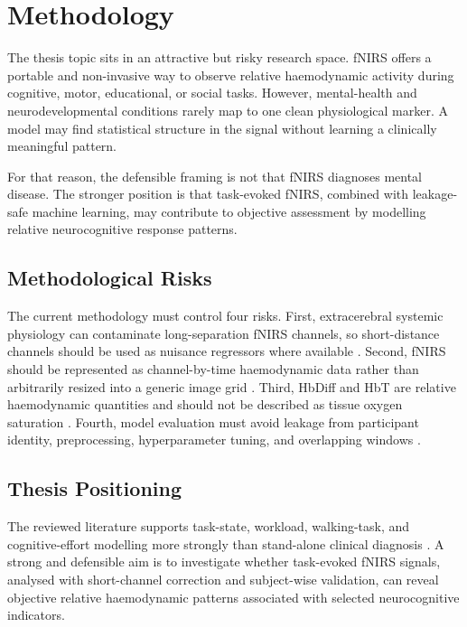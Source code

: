 \section{Methodology}

The thesis topic sits in an attractive but risky research space. fNIRS offers a portable and non-invasive way to observe relative haemodynamic activity during cognitive, motor, educational, or social tasks. However, mental-health and neurodevelopmental conditions rarely map to one clean physiological marker. A model may find statistical structure in the signal without learning a clinically meaningful pattern.

For that reason, the defensible framing is not that fNIRS diagnoses mental disease. The stronger position is that task-evoked fNIRS, combined with leakage-safe machine learning, may contribute to objective assessment by modelling relative neurocognitive response patterns.

\subsection{Methodological Risks}

The current methodology must control four risks. First, extracerebral systemic physiology can contaminate long-separation fNIRS channels, so short-distance channels should be used as nuisance regressors where available \cite{Scholkmann2022,Wyser2022,Klein2023,An2025}. Second, fNIRS should be represented as channel-by-time haemodynamic data rather than arbitrarily resized into a generic image grid \cite{Khan2025,Qin2024}. Third, HbDiff and HbT are relative haemodynamic quantities and should not be described as tissue oxygen saturation \cite{Yucel2021,Amendola2023}. Fourth, model evaluation must avoid leakage from participant identity, preprocessing, hyperparameter tuning, and overlapping windows \cite{Benerradi2023,Brookshire2024}.

\subsection{Thesis Positioning}

The reviewed literature supports task-state, workload, walking-task, and cognitive-effort modelling more strongly than stand-alone clinical diagnosis \cite{Wickramaratne2021,Eastmond2022,Ma2023,Sharmin2026}. A strong and defensible aim is to investigate whether task-evoked fNIRS signals, analysed with short-channel correction and subject-wise validation, can reveal objective relative haemodynamic patterns associated with selected neurocognitive indicators.
